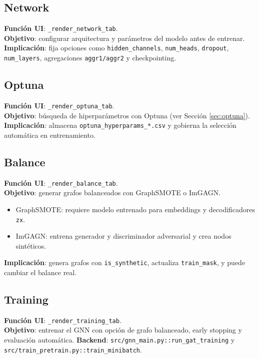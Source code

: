 \subsection{Network}
\textbf{Funci\'on UI}: \texttt{\_render\_network\_tab}.\\
\textbf{Objetivo}: configurar arquitectura y par\'ametros del modelo antes de entrenar.
\textbf{Implicaci\'on}: fija opciones como \texttt{hidden\_channels}, \texttt{num\_heads}, \texttt{dropout}, \texttt{num\_layers}, agregaciones \texttt{aggr1/aggr2} y checkpointing.

\subsection{Optuna}
\textbf{Funci\'on UI}: \texttt{\_render\_optuna\_tab}.\\
\textbf{Objetivo}: b\'usqueda de hiperpar\'ametros con Optuna (ver Secci\'on \ref{sec:optuna}).
\textbf{Implicaci\'on}: almacena \texttt{optuna\_hyperparams\_*.csv} y gobierna la selecci\'on autom\'atica en entrenamiento.

\subsection{Balance}
\textbf{Funci\'on UI}: \texttt{\_render\_balance\_tab}.\\
\textbf{Objetivo}: generar grafos balanceados con GraphSMOTE o ImGAGN.
\begin{itemize}[leftmargin=*]
  \item GraphSMOTE: requiere modelo entrenado para embeddings y decodificadores \texttt{z\textrightarrow x}.
  \item ImGAGN: entrena generador y discriminador adversarial y crea nodos sint\'eticos.
\end{itemize}
\textbf{Implicaci\'on}: genera grafos con \texttt{is\_synthetic}, actualiza \texttt{train\_mask}, y puede cambiar el balance real.

\subsection{Training}
\textbf{Funci\'on UI}: \texttt{\_render\_training\_tab}.\\
\textbf{Objetivo}: entrenar el GNN con opci\'on de grafo balanceado, early stopping y evaluaci\'on autom\'atica.
\textbf{Backend}: \texttt{src/gnn\_main.py::run\_gat\_training} y \texttt{src/train\_pretrain.py::train\_minibatch}.

